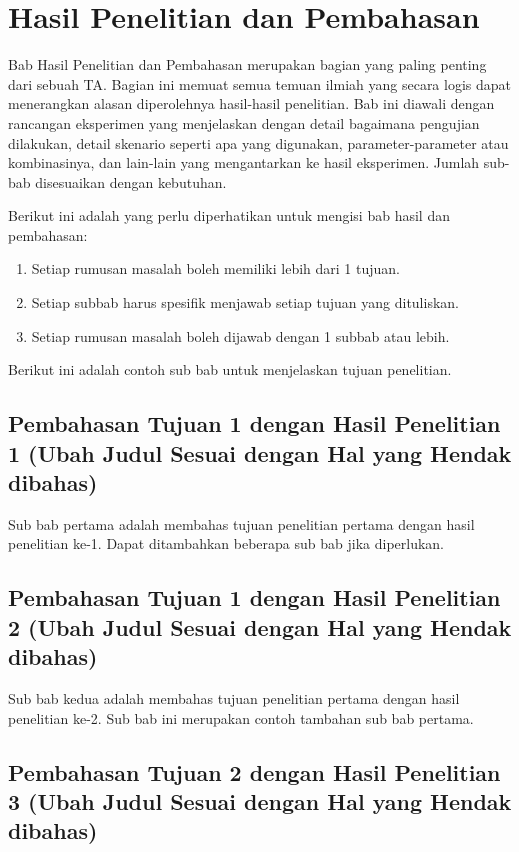 \chapter{Hasil Penelitian dan Pembahasan}

Bab Hasil Penelitian dan Pembahasan merupakan bagian yang paling penting dari sebuah TA. Bagian ini memuat semua temuan ilmiah yang secara logis dapat menerangkan alasan diperolehnya hasil-hasil penelitian. Bab ini diawali dengan rancangan eksperimen yang menjelaskan dengan detail bagaimana pengujian dilakukan, detail skenario seperti apa yang digunakan, parameter-parameter atau kombinasinya, dan lain-lain yang mengantarkan ke hasil eksperimen. Jumlah sub-bab disesuaikan dengan kebutuhan.

Berikut ini adalah yang perlu diperhatikan untuk mengisi bab hasil dan pembahasan:

\begin{enumerate}
    \item Setiap rumusan masalah boleh memiliki lebih dari 1 tujuan.
    \item Setiap subbab harus spesifik menjawab setiap tujuan yang dituliskan.
    \item Setiap rumusan masalah boleh dijawab dengan 1 subbab atau lebih.
\end{enumerate}

Berikut ini adalah contoh sub bab untuk menjelaskan tujuan penelitian.

\section{Pembahasan Tujuan 1 dengan Hasil Penelitian 1 (Ubah Judul Sesuai dengan Hal yang Hendak dibahas)}

Sub bab pertama adalah membahas tujuan penelitian pertama dengan hasil penelitian ke-1.
Dapat ditambahkan beberapa sub bab jika diperlukan.

\section{Pembahasan Tujuan 1 dengan Hasil Penelitian 2 (Ubah Judul Sesuai dengan Hal yang Hendak dibahas)}

Sub bab kedua adalah membahas tujuan penelitian pertama dengan hasil penelitian ke-2. Sub bab ini merupakan contoh tambahan sub bab pertama.

\section{Pembahasan Tujuan 2 dengan Hasil Penelitian 3 (Ubah Judul Sesuai dengan Hal yang Hendak dibahas)}

